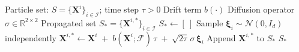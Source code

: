 \documentclass[12pt]{article}
\begin{document}
\begin{algorithm}
\caption{SDE Propagation Step}\label{alg:sde}
\begin{algorithmic}
\Require Particle set: $S=\{\mathbf{X}^i\}_{i\in\mathcal I}$; time step $\tau>0$
\Require Drift term $b(\cdot)$
\Require Diffusion operator $\sigma\in\mathbb R^{2 \times 2}$
\Ensure Propagated set $S_*=\{\mathbf{X}^{i,*}\}_{i\in\mathcal I}$
  \State $S_{*}\gets [\ ]$
    \State Sample $\boldsymbol{\xi}_i \sim \mathcal N(0,I_d)$ independently
    \State $\mathbf{X}^{i,*} \gets \mathbf{X}^i \;+\; b(\mathbf{X}^i;\mathcal F)\,\tau \;+\; \sqrt{2\tau}\,\sigma\,\boldsymbol{\xi}_i$
    \State Append $\mathbf{X}^{i,*}$ to $S_{*}$
  \EndFor
  \State \Return $S_{*}$
\EndProcedure
\end{algorithmic}
\end{algorithm}
\end{document}
